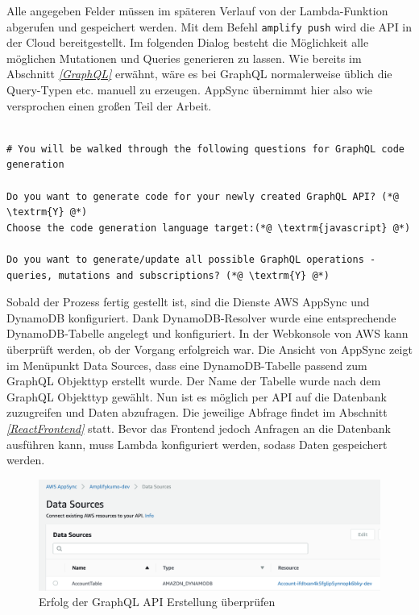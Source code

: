 Alle angegeben Felder müssen im späteren Verlauf von der Lambda-Funktion abgerufen und gespeichert werden.
Mit dem Befehl \verb+amplify push+ wird die API in der Cloud bereitgestellt.
Im folgenden Dialog besteht die Möglichkeit alle möglichen Mutationen und Queries generieren zu lassen.
Wie bereits im Abschnitt \textit{\ref{GraphQL} } erwähnt, wäre es bei GraphQL normalerweise üblich die Query-Typen etc. manuell zu erzeugen.
AppSync übernimmt hier also wie versprochen einen großen Teil der Arbeit.
\\
\begin{lstlisting}[basicstyle=\ttfamily\small, breaklines=true , frame = single, backgroundcolor=\color{flashwhite} ]

# You will be walked through the following questions for GraphQL code generation

Do you want to generate code for your newly created GraphQL API? (*@ \textrm{Y} @*)
Choose the code generation language target:(*@ \textrm{javascript} @*)

Do you want to generate/update all possible GraphQL operations -
queries, mutations and subscriptions? (*@ \textrm{Y} @*)

\end{lstlisting}


Sobald der Prozess fertig gestellt ist, sind die Dienste AWS AppSync und DynamoDB konfiguriert.
Dank DynamoDB-Resolver wurde eine entsprechende DynamoDB-Tabelle angelegt und konfiguriert.
In der Webkonsole von AWS kann überprüft werden, ob der Vorgang erfolgreich war.
Die Ansicht von AppSync zeigt im Menüpunkt \grqq Data Sources\grqq{}, dass eine DynamoDB-Tabelle passend zum GraphQL Objekttyp erstellt wurde.
Der Name der Tabelle wurde nach dem GraphQL Objekttyp gewählt.
Nun ist es möglich per API auf die Datenbank zuzugreifen und Daten abzufragen.
Die jeweilige Abfrage findet im Abschnitt \textit{\ref{ReactFrontend} } statt.
Bevor das Frontend jedoch Anfragen an die Datenbank ausführen kann, muss Lambda konfiguriert werden, sodass Daten gespeichert werden.
\\
\begin{figure}[htbp]
    \centering
    \includegraphics[width=1.0\textwidth]{50-Implementierung/AppSync-DynamoDB.png}
    \caption{Erfolg der GraphQL API Erstellung überprüfen}
    \label{fig:meine-grafik}
\end{figure}





